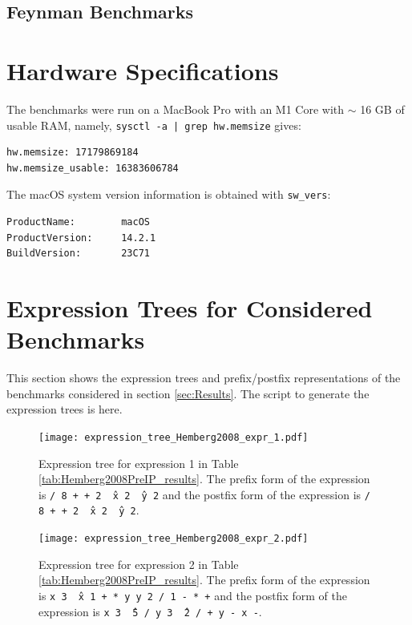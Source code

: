 \documentclass[12pt]{iopart}
\begin{document}
\subsection{Feynman Benchmarks} \label{subsec:FeynmanBenchmarks}


\newpage




\newpage

\appendix
\section{Hardware Specifications}
The benchmarks were run on a MacBook Pro with an M1 Core with $\sim$ 16 GB of usable RAM, namely, \texttt{sysctl -a | grep hw.memsize} gives: 
\begin{verbatim}
hw.memsize: 17179869184
hw.memsize_usable: 16383606784
\end{verbatim}
The macOS system version information is obtained with \texttt{sw\_vers}:
\begin{verbatim}
ProductName:		macOS
ProductVersion:		14.2.1
BuildVersion:		23C71
\end{verbatim}
\section{Expression Trees for Considered Benchmarks} %
This section shows the expression trees and prefix/postfix representations of the benchmarks considered in section \ref{sec:Results}. The script to generate the expression trees is here. %

\begin{figure}
    \centering
    \texttt{[image: expression\_tree\_Hemberg2008\_expr\_1.pdf]}
    \caption{Expression tree for expression 1 in Table \ref{tab:Hemberg2008PreIP_results}. The prefix form of the expression is \texttt{/ 8 + + 2 \^\ x 2 \^\ y 2} and the postfix form of the expression is \texttt{/ 8 + + 2 \^\ x 2 \^\ y 2}. }
    \label{fig:expression_tree_Hemberg2008_expr_1}
\end{figure}

\begin{figure}
    \centering
    \texttt{[image: expression\_tree\_Hemberg2008\_expr\_2.pdf]}
    \caption{Expression tree for expression 2 in Table \ref{tab:Hemberg2008PreIP_results}. The prefix form of the expression is \texttt{x 3 \^\ x 1 + * y y 2 / 1 - * +} and the postfix form of the expression is \texttt{x 3 \^\ 5 / y 3 \^\ 2 / + y - x -}. } 
    \label{fig:expression_tree_Hemberg2008_expr_2}
\end{figure}
\end{document}
